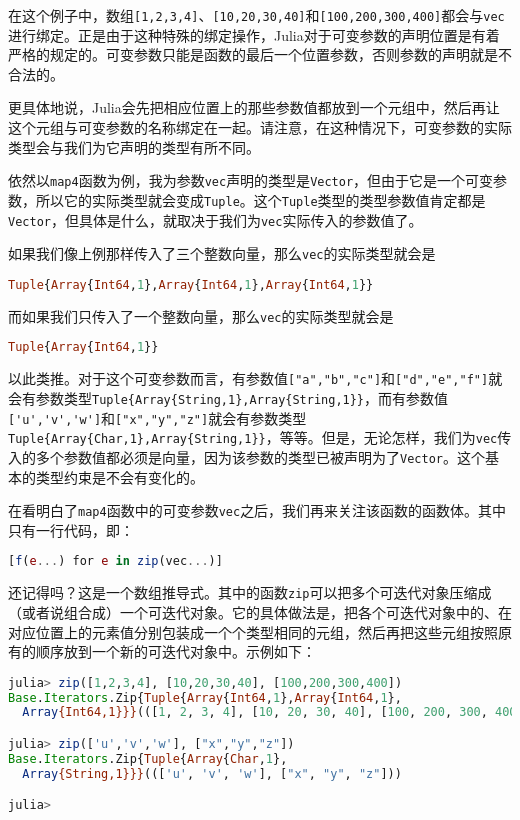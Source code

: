 在这个例子中，数组\verb`[1,2,3,4]`、\verb`[10,20,30,40]`和\verb`[100,200,300,400]`都会与\verb`vec`进行绑定。正是由于这种特殊的绑定操作，Julia对于可变参数的声明位置是有着严格的规定的。可变参数只能是函数的最后一个位置参数，否则参数的声明就是不合法的。

更具体地说，Julia会先把相应位置上的那些参数值都放到一个元组中，然后再让这个元组与可变参数的名称绑定在一起。请注意，在这种情况下，可变参数的实际类型会与我们为它声明的类型有所不同。

依然以\verb`map4`函数为例，我为参数\verb`vec`声明的类型是\verb`Vector`，但由于它是一个可变参数，所以它的实际类型就会变成\verb`Tuple`。这个\verb`Tuple`类型的类型参数值肯定都是\verb`Vector`，但具体是什么，就取决于我们为\verb`vec`实际传入的参数值了。

如果我们像上例那样传入了三个整数向量，那么\verb`vec`的实际类型就会是

\begin{lstlisting}[language=julia]
Tuple{Array{Int64,1},Array{Int64,1},Array{Int64,1}}
\end{lstlisting}

而如果我们只传入了一个整数向量，那么\verb`vec`的实际类型就会是

\begin{lstlisting}[language=julia]
Tuple{Array{Int64,1}}
\end{lstlisting}

以此类推。对于这个可变参数而言，有参数值\verb`["a","b","c"]`和\verb`["d","e","f"]`就会有参数类型\verb`Tuple{Array{String,1},Array{String,1}}`，而有参数值\verb`['u','v','w']`和\verb`["x","y","z"]`就会有参数类型\verb`Tuple{Array{Char,1},Array{String,1}}`，等等。但是，无论怎样，我们为\verb`vec`传入的多个参数值都必须是向量，因为该参数的类型已被声明为了\verb`Vector`。这个基本的类型约束是不会有变化的。

在看明白了\verb`map4`函数中的可变参数\verb`vec`之后，我们再来关注该函数的函数体。其中只有一行代码，即：

\begin{lstlisting}[language=julia]
[f(e...) for e in zip(vec...)]
\end{lstlisting}

还记得吗？这是一个数组推导式。其中的函数\verb`zip`可以把多个可迭代对象压缩成（或者说组合成）一个可迭代对象。它的具体做法是，把各个可迭代对象中的、在对应位置上的元素值分别包装成一个个类型相同的元组，然后再把这些元组按照原有的顺序放到一个新的可迭代对象中。示例如下：

\begin{lstlisting}[language=julia]
julia> zip([1,2,3,4], [10,20,30,40], [100,200,300,400])
Base.Iterators.Zip{Tuple{Array{Int64,1},Array{Int64,1},
  Array{Int64,1}}}(([1, 2, 3, 4], [10, 20, 30, 40], [100, 200, 300, 400]))

julia> zip(['u','v','w'], ["x","y","z"])
Base.Iterators.Zip{Tuple{Array{Char,1},
  Array{String,1}}}((['u', 'v', 'w'], ["x", "y", "z"]))

julia> 
\end{lstlisting}

